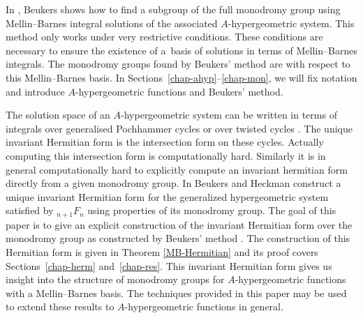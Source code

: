 In \cite{Beu13}, Beukers shows how to find a subgroup of the full monodromy group using Mellin--Barnes integral solutions of the associated $A$-hypergeometric system. This method only works under very restrictive conditions. These conditions are necessary to ensure the existence of a~basis of solutions in terms of Mellin--Barnes integrals. The monodromy groups found by Beukers' method are with respect to this Mellin--Barnes basis. In Sections~\ref{chap-ahyp}--\ref{chap-mon}, we will fix notation and introduce $A$-hypergeometric functions and Beukers' method.

The solution space of an $A$-hypergeometric system can be written in terms of integrals over generalised Pochhammer cycles \cite{Beu08} or over twisted cycles \cite{Kit94}. The unique invariant Hermitian form is the intersection form on these cycles. Actually computing this intersection form is computationally hard. Similarly it is in general computationally hard to explicitly compute an invariant hermitian form directly from a given monodromy group. In \cite{Beu89} Beukers and Heckman construct a unique invariant Hermitian form for the generalized hypergeometric system satisfied by ${}_{n+1}F_{n}$ using properties of its monodromy group. The goal of this paper is to give an explicit construction of the invariant Hermitian form over the monodromy group as constructed by Beukers' method \cite{Beu13}. The construction of this Hermitian form is given in Theorem \ref{MB-Hermitian} and its proof covers Sections~\ref{chap-herm} and~\ref{chap-res}. This invariant Hermitian form gives us insight into the structure of monodromy groups for $A$-hypergeometric functions with a Mellin--Barnes basis. The techniques provided in this paper may be used to extend these results to $A$-hypergeometric functions in general.
